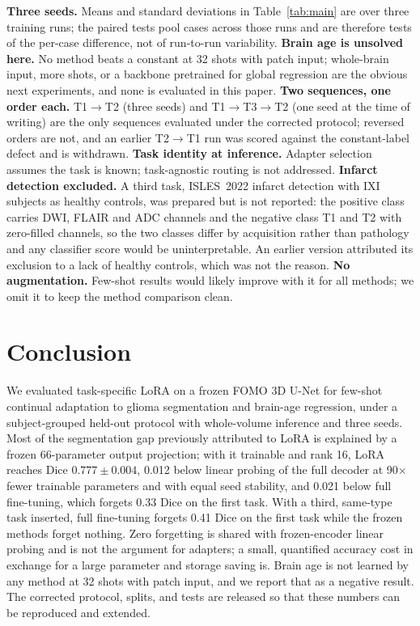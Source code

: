 \documentclass[journal,twoside,web]{ieeecolor}
\begin{document}
\textbf{Three seeds.} Means and standard deviations in Table~\ref{tab:main} are over three training runs; the paired tests pool cases across those runs and are therefore tests of the per-case difference, not of run-to-run variability. \textbf{Brain age is unsolved here.} No method beats a constant at 32 shots with patch input; whole-brain input, more shots, or a backbone pretrained for global regression are the obvious next experiments, and none is evaluated in this paper. \textbf{Two sequences, one order each.} T1$\to$T2 (three seeds) and T1$\to$T3$\to$T2 (one seed at the time of writing) are the only sequences evaluated under the corrected protocol; reversed orders are not, and an earlier T2$\to$T1 run was scored against the constant-label defect and is withdrawn. \textbf{Task identity at inference.} Adapter selection assumes the task is known; task-agnostic routing is not addressed. \textbf{Infarct detection excluded.} A third task, ISLES~2022 infarct detection with IXI subjects as healthy controls, was prepared but is not reported: the positive class carries DWI, FLAIR and ADC channels and the negative class T1 and T2 with zero-filled channels, so the two classes differ by acquisition rather than pathology and any classifier score would be uninterpretable. An earlier version attributed its exclusion to a lack of healthy controls, which was not the reason. \textbf{No augmentation.} Few-shot results would likely improve with it for all methods; we omit it to keep the method comparison clean.

\section{Conclusion}
\label{sec:conclusion}

We evaluated task-specific LoRA on a frozen FOMO 3D U-Net for few-shot continual adaptation to glioma segmentation and brain-age regression, under a subject-grouped held-out protocol with whole-volume inference and three seeds. Most of the segmentation gap previously attributed to LoRA is explained by a frozen 66-parameter output projection; with it trainable and rank 16, LoRA reaches Dice $0.777\pm0.004$, 0.012 below linear probing of the full decoder at 90$\times$ fewer trainable parameters and with equal seed stability, and 0.021 below full fine-tuning, which forgets 0.33 Dice on the first task. With a third, same-type task inserted, full fine-tuning forgets 0.41 Dice on the first task while the frozen methods forget nothing. Zero forgetting is shared with frozen-encoder linear probing and is not the argument for adapters; a small, quantified accuracy cost in exchange for a large parameter and storage saving is. Brain age is not learned by any method at 32 shots with patch input, and we report that as a negative result. The corrected protocol, splits, and tests are released so that these numbers can be reproduced and extended.
\end{document}
